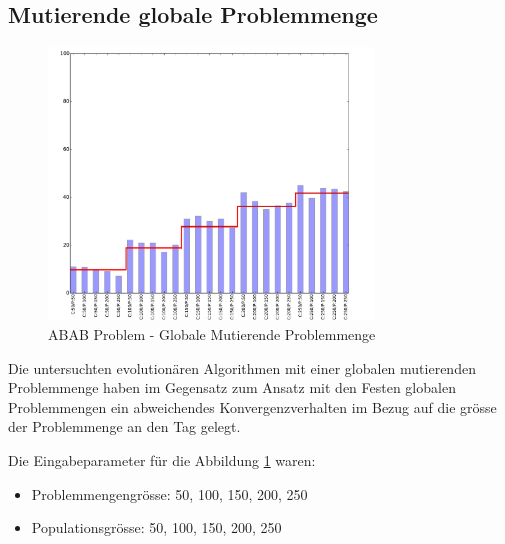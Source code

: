 \subsection{Mutierende globale Problemmenge}
\begin{figure}[h]
  \centering
  \includegraphics[width=0.77\textwidth]{images/E_G_abab_solved.pdf}
  \caption[ABAB Problem - Globale Mutierende Problemmenge]{ABAB Problem - Globale Mutierende Problemmenge}
  \label{fig:e_g_abab}
\end{figure}
Die untersuchten evolutionären Algorithmen mit einer globalen mutierenden Problemmenge haben im Gegensatz zum Ansatz mit den Festen globalen Problemmengen ein abweichendes Konvergenzverhalten im Bezug auf die grösse der Problemmenge an den Tag gelegt.

Die Eingabeparameter für die Abbildung \ref{fig:e_g_abab} waren:
\begin{itemize}
	\item Problemmengengrösse: 50, 100, 150, 200, 250
	\item Populationsgrösse: 50, 100, 150, 200, 250
\end{itemize}

